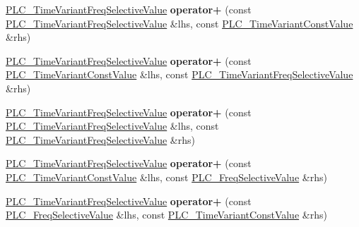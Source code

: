 \begin{DoxyCompactItemize}
\item 
\hypertarget{classns3_1_1PLC__TimeVariantFreqSelectiveValue_a4e2701896a89411105a0563e51681b5b}{\hyperlink{classns3_1_1PLC__TimeVariantFreqSelectiveValue}{\-P\-L\-C\-\_\-\-Time\-Variant\-Freq\-Selective\-Value} {\bfseries operator+} (const \hyperlink{classns3_1_1PLC__TimeVariantFreqSelectiveValue}{\-P\-L\-C\-\_\-\-Time\-Variant\-Freq\-Selective\-Value} \&lhs, const \hyperlink{classns3_1_1PLC__TimeVariantConstValue}{\-P\-L\-C\-\_\-\-Time\-Variant\-Const\-Value} \&rhs)}\label{classns3_1_1PLC__TimeVariantFreqSelectiveValue_a4e2701896a89411105a0563e51681b5b}

\item 
\hypertarget{classns3_1_1PLC__TimeVariantFreqSelectiveValue_ad33c0d7cd032dd868369e78efb5b6203}{\hyperlink{classns3_1_1PLC__TimeVariantFreqSelectiveValue}{\-P\-L\-C\-\_\-\-Time\-Variant\-Freq\-Selective\-Value} {\bfseries operator+} (const \hyperlink{classns3_1_1PLC__TimeVariantConstValue}{\-P\-L\-C\-\_\-\-Time\-Variant\-Const\-Value} \&lhs, const \hyperlink{classns3_1_1PLC__TimeVariantFreqSelectiveValue}{\-P\-L\-C\-\_\-\-Time\-Variant\-Freq\-Selective\-Value} \&rhs)}\label{classns3_1_1PLC__TimeVariantFreqSelectiveValue_ad33c0d7cd032dd868369e78efb5b6203}

\item 
\hypertarget{classns3_1_1PLC__TimeVariantFreqSelectiveValue_a9e97d9b1d9b36eb11a35435adfa6175b}{\hyperlink{classns3_1_1PLC__TimeVariantFreqSelectiveValue}{\-P\-L\-C\-\_\-\-Time\-Variant\-Freq\-Selective\-Value} {\bfseries operator+} (const \hyperlink{classns3_1_1PLC__TimeVariantFreqSelectiveValue}{\-P\-L\-C\-\_\-\-Time\-Variant\-Freq\-Selective\-Value} \&lhs, const \hyperlink{classns3_1_1PLC__TimeVariantFreqSelectiveValue}{\-P\-L\-C\-\_\-\-Time\-Variant\-Freq\-Selective\-Value} \&rhs)}\label{classns3_1_1PLC__TimeVariantFreqSelectiveValue_a9e97d9b1d9b36eb11a35435adfa6175b}

\item 
\hypertarget{classns3_1_1PLC__TimeVariantFreqSelectiveValue_aa0651ee3ee605b4d029fcb89d93b5dd2}{\hyperlink{classns3_1_1PLC__TimeVariantFreqSelectiveValue}{\-P\-L\-C\-\_\-\-Time\-Variant\-Freq\-Selective\-Value} {\bfseries operator+} (const \hyperlink{classns3_1_1PLC__TimeVariantConstValue}{\-P\-L\-C\-\_\-\-Time\-Variant\-Const\-Value} \&lhs, const \hyperlink{classns3_1_1PLC__FreqSelectiveValue}{\-P\-L\-C\-\_\-\-Freq\-Selective\-Value} \&rhs)}\label{classns3_1_1PLC__TimeVariantFreqSelectiveValue_aa0651ee3ee605b4d029fcb89d93b5dd2}

\item 
\hypertarget{classns3_1_1PLC__TimeVariantFreqSelectiveValue_a2af198eff18574f291b5ecdbfd131851}{\hyperlink{classns3_1_1PLC__TimeVariantFreqSelectiveValue}{\-P\-L\-C\-\_\-\-Time\-Variant\-Freq\-Selective\-Value} {\bfseries operator+} (const \hyperlink{classns3_1_1PLC__FreqSelectiveValue}{\-P\-L\-C\-\_\-\-Freq\-Selective\-Value} \&lhs, const \hyperlink{classns3_1_1PLC__TimeVariantConstValue}{\-P\-L\-C\-\_\-\-Time\-Variant\-Const\-Value} \&rhs)}\label{classns3_1_1PLC__TimeVariantFreqSelectiveValue_a2af198eff18574f291b5ecdbfd131851}


\end{DoxyCompactItemize}
